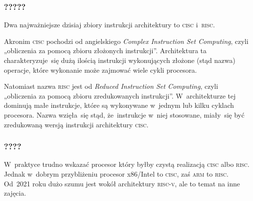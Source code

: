 \documentclass[10pt,t]{beamer}
\begin{document}
\begin{frame}
  \frametitle{?????}


  Dwa najważniejsze dzisiaj zbiory instrukcji architektury to
  \alert{\textsc{cisc}} i~\alert{\textsc{risc}}.

  Akronim \textsc{cisc} pochodzi od angielskiego \textit{Complex
    Instruction Set Computing}, czyli „obliczenia za pomocą zbioru
  złożonych instrukcji”. Architektura ta charakteryzuje~się dużą ilością
  instrukcji wykonujących złożone (stąd nazwa) operacje, które wykonanie
  może zajmować wiele cykli procesora.

  Natomiast nazwa \textsc{risc} jest od \textit{Reduced Instruction Set
    Computing}, czyli „obliczenia za pomocą zbioru zredukowanych
  instrukcji”. W~architekturze tej dominują małe instrukcje, które są
  wykonywane w~jednym lub kilku cyklach procesora. Nazwa wzięła~się
  stąd, że~instrukcje w~niej stosowane, miały~się być zredukowaną wersją
  instrukcji architektury \textsc{cisc}.

\end{frame}





\begin{frame}
  \frametitle{????}


  W~praktyce trudno wskazać procesor który byłby czystą realizacją
  \textsc{cisc} albo \textsc{risc}. Jednak w~dobrym przybliżeniu procesor
  x86/Intel to \textsc{cisc}, zaś \textsc{arm} to \textsc{risc}. Od~2021
  roku dużo szumu jest wokół architektury \textsc{risc-v}, ale to temat na
  inne zajęcia.

\end{frame}











\printbibliography






\end{document}
